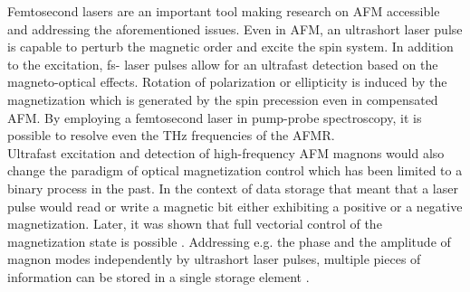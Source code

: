 Femtosecond lasers are an important tool making research on AFM accessible and addressing the aforementioned issues.
Even in AFM, an ultrashort laser pulse is capable to perturb the magnetic order and excite the spin system.
In addition to the excitation, fs- laser pulses allow for an ultrafast detection based on the magneto-optical effects.
Rotation of polarization or ellipticity is induced by the magnetization which is generated by the spin precession even in compensated AFM\cite{nemec_antiferromagnetic_2018, bossini_femtosecond_2017}.
By employing a femtosecond laser in pump-probe spectroscopy, it is possible to resolve even the THz frequencies of the AFMR. \\
Ultrafast excitation and detection of high-frequency AFM magnons would also change the paradigm of optical magnetization control which has been limited to a binary process in the past.
In the context of data storage that meant that a laser pulse would read or write a magnetic bit either exhibiting a positive or a negative magnetization.
Later, it was shown that full vectorial control of the magnetization state is possible \cite{kanda_vectorial_2011, satoh_writing_2015}.
Addressing e.g. the phase and the amplitude of magnon modes independently by ultrashort laser pulses, multiple pieces of information can be stored in a single storage element \cite{nemec_antiferromagnetic_2018}.

